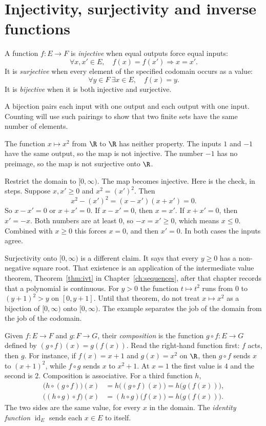 \section{Injectivity, surjectivity and inverse functions}

\begin{definitionx}
A function $f:E\to F$ is \emph{injective} when equal outputs force equal inputs:
\[
\forall x,x'\in E,\quad f(x)=f(x')\Rightarrow x=x'.
\]
It is \emph{surjective} when every element of the specified codomain occurs as a value:
\[
\forall y\in F\ \exists x\in E,\quad f(x)=y.
\]
It is \emph{bijective} when it is both injective and surjective.
\end{definitionx}

A bijection pairs each input with one output and each output with one input. Counting will use such pairings to show that two finite sets have the same number of elements.

The function $x\mapsto x^2$ from $\R$ to $\R$ has neither property. The inputs $1$ and $-1$ have the same output, so the map is not injective. The number $-1$ has no preimage, so the map is not surjective onto $\R$.

Restrict the domain to $[0,\infty)$. The map becomes injective. Here is the check, in steps. Suppose $x,x'\ge 0$ and $x^2=(x')^2$. Then
\[
x^2-(x')^2=(x-x')(x+x')=0.
\]
So $x-x'=0$ or $x+x'=0$. If $x-x'=0$, then $x=x'$. If $x+x'=0$, then $x'=-x$. Both numbers are at least $0$, so $-x=x'\ge 0$, which means $x\le 0$. Combined with $x\ge 0$ this forces $x=0$, and then $x'=0$. In both cases the inputs agree.

Surjectivity onto $[0,\infty)$ is a different claim. It says that every $y\ge 0$ has a non-negative square root. That existence is an application of the intermediate value theorem, Theorem~\ref{thm:ivt} in Chapter~\ref{ch:sequences}, after that chapter records that a polynomial is continuous. For $y>0$ the function $t\mapsto t^2$ runs from $0$ to $(y+1)^2>y$ on $[0,y+1]$. Until that theorem, do not treat $x\mapsto x^2$ as a bijection of $[0,\infty)$ onto $[0,\infty)$. The example separates the job of the domain from the job of the codomain.

Given $f:E\to F$ and $g:F\to G$, their \emph{composition} is the function $g\circ f:E\to G$ defined by $(g\circ f)(x)=g(f(x))$. Read the right-hand function first: $f$ acts, then $g$. For instance, if $f(x)=x+1$ and $g(x)=x^2$ on $\R$, then $g\circ f$ sends $x$ to $(x+1)^2$, while $f\circ g$ sends $x$ to $x^2+1$. At $x=1$ the first value is $4$ and the second is $2$. Composition is associative. For a third function $h$,
\begin{align*}
\bigl(h\circ(g\circ f)\bigr)(x)
&=h\bigl((g\circ f)(x)\bigr)
=h\bigl(g(f(x))\bigr),\\
\bigl((h\circ g)\circ f\bigr)(x)
&=(h\circ g)\bigl(f(x)\bigr)
=h\bigl(g(f(x))\bigr).
\end{align*}
The two sides are the same value, for every $x$ in the domain. The \emph{identity function} $\operatorname{id}_E$ sends each $x\in E$ to itself.

